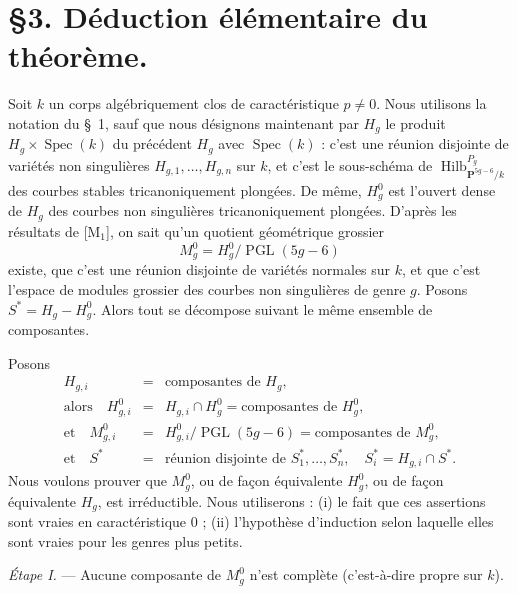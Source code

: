 \documentclass[10pt]{article}
\newcommand{\Spec}{\operatorname{Spec}}
\newcommand{\PGL}{\operatorname{PGL}}
\newcommand{\Hilb}{\operatorname{Hilb}}
\newcommand{\PP}{\mathbf P}
\begin{document}
\section*{\S 3. Déduction élémentaire du théorème.}

Soit $k$ un corps algébriquement clos de caractéristique $p\ne0$. Nous utilisons la notation du \S~1, sauf que nous désignons maintenant par $H_g$ le produit $H_g\times\Spec(k)$ du précédent $H_g$ avec $\Spec(k)$ : c'est une réunion disjointe de variétés non singulières $H_{g,1},\ldots,H_{g,n}$ sur $k$, et c'est le sous-schéma de $\Hilb_{\PP^{5g-6}/k}^{P_g}$ des courbes stables tricanoniquement plongées. De même, $H_g^0$ est l'ouvert dense de $H_g$ des courbes non singulières tricanoniquement plongées. D'après les résultats de [M$_1$], on sait qu'un quotient géométrique grossier
\[
M_g^0=H_g^0/\PGL(5g-6)
\]
existe, que c'est une réunion disjointe de variétés normales sur $k$, et que c'est l'espace de modules grossier des courbes non singulières de genre $g$. Posons $S^*=H_g-H_g^0$. Alors tout se décompose suivant le même ensemble de composantes.

Posons
\[
\begin{array}{rcl}
H_{g,i}&=&\text{composantes de }H_g,\\
\text{alors}\quad H^0_{g,i}&=&H_{g,i}\cap H_g^0=\text{composantes de }H_g^0,\\
\text{et}\quad M^0_{g,i}&=&H^0_{g,i}/\PGL(5g-6)=\text{composantes de }M_g^0,\\
\text{et}\quad S^*&=&\text{réunion disjointe de }S_1^*,\ldots,S_n^*,\quad S_i^*=H_{g,i}\cap S^*.
\end{array}
\]
Nous voulons prouver que $M_g^0$, ou de façon équivalente $H_g^0$, ou de façon équivalente $H_g$, est irréductible. Nous utiliserons : (i) le fait que ces assertions sont vraies en caractéristique $0$ ; (ii) l'hypothèse d'induction selon laquelle elles sont vraies pour les genres plus petits.

\medskip
\noindent\emph{Étape I.} --- Aucune composante de $M_g^0$ n'est complète (c'est-à-dire propre sur $k$).
\end{document}
